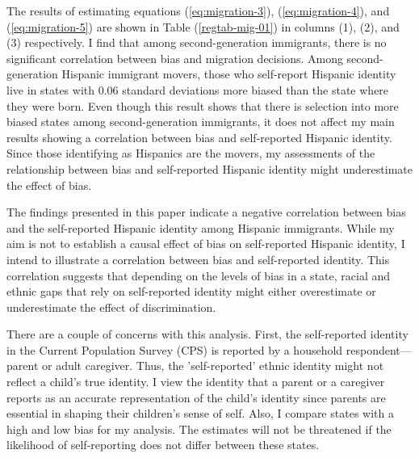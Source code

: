 \documentclass[12pt,english]{article}
\begin{document}
The results of estimating equations (\ref{eq:migration-3}), (\ref{eq:migration-4}), and (\ref{eq:migration-5}) are shown in Table (\ref{regtab-mig-01}) in columns (1), (2), and (3) respectively. I find that among second-generation immigrants, there is no significant correlation between bias and migration decisions. Among second-generation Hispanic immigrant movers, those who self-report Hispanic identity live in states with 0.06 standard deviations more biased than the state where they were born. Even though this result shows that there is selection into more biased states among second-generation immigrants, it does not affect my main results showing a correlation between bias and self-reported Hispanic identity. Since those identifying as Hispanics are the movers, my assessments of the relationship between bias and self-reported Hispanic identity might underestimate the effect of bias.

The findings presented in this paper indicate a negative correlation between bias and the self-reported Hispanic identity among Hispanic immigrants. While my aim is not to establish a causal effect of bias on self-reported Hispanic identity, I intend to illustrate a correlation between bias and self-reported identity. This correlation suggests that depending on the levels of bias in a state, racial and ethnic gaps that rely on self-reported identity might either overestimate or underestimate the effect of discrimination.

There are a couple of concerns with this analysis. First, the self-reported identity in the Current Population Survey (CPS) is reported by a household respondent—parent or adult caregiver. Thus, the 'self-reported' ethnic identity might not reflect a child's true identity. I view the identity that a parent or a caregiver reports as an accurate representation of the child's identity since parents are essential in shaping their children's sense of self. Also, I compare states with a high and low bias for my analysis. The estimates will not be threatened if the likelihood of self-reporting does not differ between these states.
\end{document}
